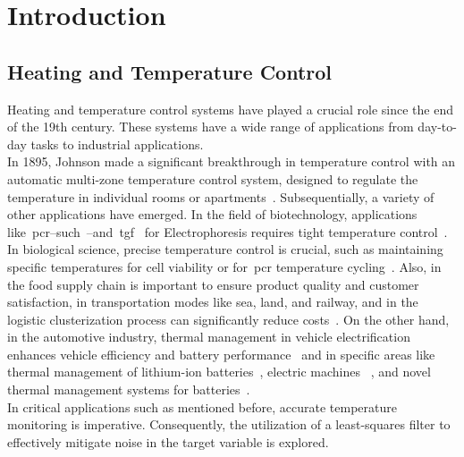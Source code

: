 \section{Introduction}

\subsection{Heating and Temperature Control}
Heating and temperature control systems have played a crucial role since the end of the 19th century. These systems have a wide range of applications from day-to-day tasks to industrial applications. \\

In 1895, Johnson made a significant breakthrough in temperature control with an automatic multi-zone temperature control system, designed to regulate the temperature in individual rooms or apartments~\cite{us542733s}. Subsequentially, a variety of other applications have emerged. In the field of biotechnology, applications like~\acrfull{pcr}--such~\cite{MULLIS1987335, saiki1988, Bartlett2003, C6LC00984K, maltezos2010, mcknight2000, B208405H, hua2010multiplexed, mahjoob2008rapid, dinca2009fast, lien2009microfluidic, qiu2010large, hsieh2008enhancement, shen2005microchip, wang2009miniaturized}--and~\acrfull{tgf}~\cite{matsui2007temperature, ross2002microfluidic} for Electrophoresis requires tight temperature control~\cite{diagnostics3010033}. In biological science, precise temperature control is crucial, such as maintaining specific temperatures for cell viability or for~\acrshort{pcr} temperature cycling~\cite{diagnostics3010033, hung2005microfluid}. Also, in the food supply chain is important to ensure product quality and customer satisfaction, in transportation modes like sea, land, and railway, and in the logistic clusterization process can significantly reduce costs~\cite{baskutis2015temp}. On the other hand, in the automotive industry, thermal management in vehicle electrification enhances vehicle efficiency and battery performance~\cite{casals2016sustainability, previati2022thermal} and in specific areas like thermal management of lithium-ion batteries~\cite{karimi2013thermal}, electric machines ~\cite{yang2017thermal}, and novel thermal management systems for batteries~\cite{al2018review}. \\

In critical applications such as mentioned before, accurate temperature monitoring is imperative. Consequently, the utilization of a least-squares filter to effectively mitigate noise in the target variable is explored.


